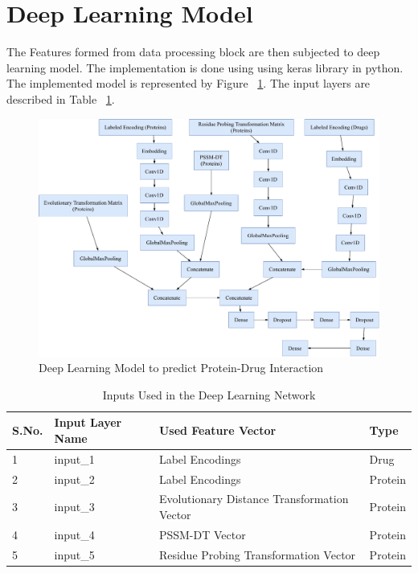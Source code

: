 
  \section{Deep Learning Model}
  
  The Features formed from data processing block are then subjected to deep learning model. The implementation is done using  using keras library in python. The implemented model is represented by Figure ~\ref{fig:dlm}. The input layers are described in Table ~\ref{table:inputs}.
  
  \begin{figure}[H]
  \centering
  \includegraphics[width=1\linewidth]{mainmatter/3-Methodology/images/DeepDF.pdf}
  \caption{Deep Learning Model to predict Protein-Drug Interaction}
  \label{fig:dlm}
  \end{figure}
  \begin{table}[H]\centering
    \caption{Inputs Used in the Deep Learning Network} 
    \begin{tabular}{|l|l|l|l|}
      \hline 
      S.No. & Input Layer Name & Used Feature Vector & Type \\ \hline
      1 & input\_1 & Label Encodings & Drug \\ \hline
      2 & input\_2 & Label Encodings & Protein \\ \hline
      3 & input\_3 & Evolutionary Distance Transformation Vector& Protein \\ \hline
      4 & input\_4 & PSSM-DT Vector & Protein \\ \hline
      5 & input\_5 & Residue Probing Transformation Vector & Protein \\   \hline 
    \end{tabular} 
    \label{table:inputs}
  \end{table}
  
